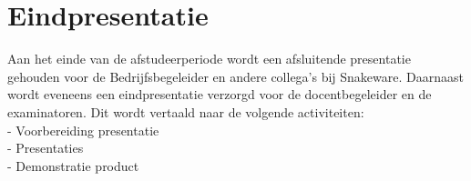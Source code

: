 \section{Eindpresentatie}
Aan het einde van de afstudeerperiode wordt een afsluitende presentatie gehouden voor de Bedrijfsbegeleider en andere collega's bij Snakeware.
Daarnaast wordt eveneens een eindpresentatie verzorgd voor de docentbegeleider en de examinatoren.
Dit wordt vertaald naar de volgende activiteiten: \\
- Voorbereiding presentatie \\
- Presentaties \\
- Demonstratie product
